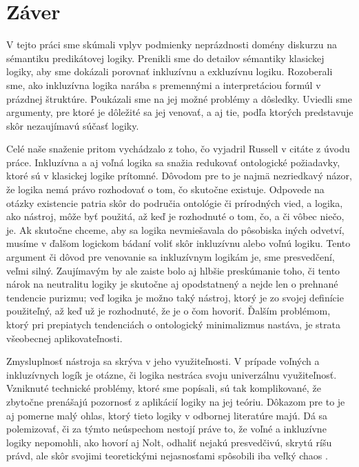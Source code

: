 \documentclass[12pt, letterpaper]{article}
\begin{document}
\section{Záver}
V tejto práci sme skúmali vplyv podmienky neprázdnosti domény diskurzu na sémantiku predikátovej logiky. 
Prenikli sme do detailov sémantiky klasickej logiky, aby sme dokázali porovnať inkluzívnu a exkluzívnu logiku. 
Rozoberali sme, ako inkluzívna logika narába s premennými a interpretáciou formúl v prázdnej štruktúre. 
Poukázali sme na jej možné problémy a dôsledky. 
Uviedli sme argumenty, pre ktoré je dôležité sa jej venovať, a aj tie, podľa ktorých predstavuje skôr nezaujímavú súčasť logiky.\par
Celé naše snaženie pritom vychádzalo z toho, čo vyjadril Russell v citáte z úvodu práce.
Inkluzívna a aj voľná logika sa snažia redukovať ontologické požiadavky, ktoré sú v klasickej logike prítomné. 
Dôvodom pre to je najmä nezriedkavý názor, že logika nemá právo rozhodovať o tom, čo skutočne existuje. 
Odpovede na otázky existencie patria skôr do područia ontológie či prírodných vied, a logika, ako nástroj, môže byť použitá, až keď je rozhodnuté o tom, čo, a či vôbec niečo, je. 
Ak skutočne chceme, aby sa logika nevmiešavala do pôsobiska iných odvetví, musíme v ďalšom logickom bádaní voliť skôr inkluzívnu alebo voľnú logiku.
Tento argument či dôvod pre venovanie sa inkluzívnym logikám je, sme presvedčení, veľmi silný.  
Zaujímavým by ale zaiste bolo aj hlbšie preskúmanie toho, či tento nárok na neutralitu logiky je skutočne aj opodstatnený a nejde len o prehnané tendencie purizmu; veď logika je možno taký nástroj, ktorý je zo svojej definície použiteľný, až keď už je rozhodnuté, že je o čom hovoriť. 
Ďalším problémom, ktorý pri prepiatych tendenciách o ontologický minimalizmus nastáva, je strata všeobecnej aplikovateľnosti.\par
Zmysluplnosť nástroja sa skrýva v jeho využiteľnosti. V prípade voľných a inkluzívnych logík je otázne, či logika nestráca svoju univerzálnu využiteľnosť. Vzniknuté technické problémy, ktoré sme popísali, sú tak komplikované, že zbytočne prenášajú pozornosť z aplikácií logiky na jej teóriu. Dôkazom pre to je aj pomerne malý ohlas, ktorý tieto logiky v odbornej literatúre majú. Dá sa polemizovať, či za týmto neúspechom nestojí práve to, že voľné a inkluzívne logiky nepomohli, ako hovorí aj Nolt, odhaliť nejakú presvedčivú, skrytú ríšu právd, ale skôr svojimi teoretickými nejasnosťami spôsobili iba veľký chaos \parencites[1057]{Nolt2007}.
\end{document}

